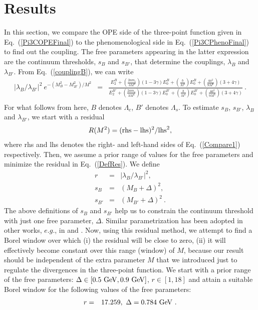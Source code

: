 \documentclass[twoside]{article}
\begin{document}
\section{Results}
In this section, we compare the OPE side of the three-point function given in 
Eq.~(\ref{Pi3COPEFinal}) to the phenomenological side in 
Eq.~(\ref{Pi3CPhenoFinal}) to find out the coupling. The free parameters 
appearing in the latter expression are the continuum thresholds, $s_{B}$ and 
$s_{B'}$, that determine the couplings, $\lambda_B$ and $\lambda_{B'}$. From 
Eq.~(\ref{couplingB}), we can write
\begin{eqnarray}
\label{Compare1}
\vert \lambda_B/\lambda_{B'} \vert ^2~ e^{-(M_B^2 - M_{B'}^2)/M^2}
&=&
\frac{E_2^{B} + \left(\frac{2 a m_c}{3 M^4} \right) (1 - 3 \gamma) E_0^B + 
\left(\frac{b}{M^4}\right) E_0^B + \left(\frac{4a^2}{9M^6}\right)(3 + 4 \gamma)}
{E_2^{B'} + \left(\frac{2 a m_{s}}{3 M^4} \right) (1 - 3 \gamma) E_0^{B'} + 
\left(\frac{b}{M^4}\right) E_0^{B'} + \left(\frac{4a^2}{9M^6}\right)(3 + 4 
\gamma)}~.\nonumber\\
\end{eqnarray}
For what follows from here, $B$ denotes $\Lambda_c$, $B'$ denotes $\Lambda_s$. 
To estimate $s_B$, $s_{B'}$, $\lambda_B$ and $\lambda_{B'}$, we start with a 
residual
\begin{eqnarray}
\label{DefRes}
R(M^2) = (\rm{rhs} - \rm{lhs})^2/\rm{lhs}^2,
\end{eqnarray}
where rhs and lhs denotes the right- and left-hand sides of 
Eq.~(\ref{Compare1}) respectively. Then, we assume a prior range of values for 
the free parameters and minimize the residual in Eq.~(\ref{DefRes}). We define 
\begin{eqnarray}
r &=& \vert \lambda_B/\lambda_{B'} \vert ^2, \\
s_B &=& \left( M_B + \Delta \right)^2, \\
s_{B'} &=& \left( M_{B'} + \Delta \right)^2~.
\end{eqnarray}
The above definitions of $s_B$ and $s_{B'}$ help us to constrain the continuum 
threshold with just one free parameter, $\Delta$. Similar parametrization has 
been adopted in other works, $e.g.$, in \cite{Nielson1999} and 
\cite{Nielson2000}. Now, using this residual method, we attempt to find a Borel
 window over which (i) the residual will be close to zero, (ii) it will 
effectively become constant over this range (window) of $M$, because our result
 should be independent of the extra parameter $M$ that we introduced just to 
regulate the divergences in the three-point function. We start with a prior 
range of the free parameters: $\Delta \in \left[ 0.5~{\rm{GeV}}, 0.9~{\rm{GeV}}
 \right]$, $r \in \left[1, 18 \right]$ and attain a suitable Borel window for 
the following values of the free parameters:
\begin{eqnarray}
\label{EstimaterAndDelta}
r &=& 17.259,~\Delta = 0.784~\rm{GeV}~.
\end{eqnarray}
\end{document}
